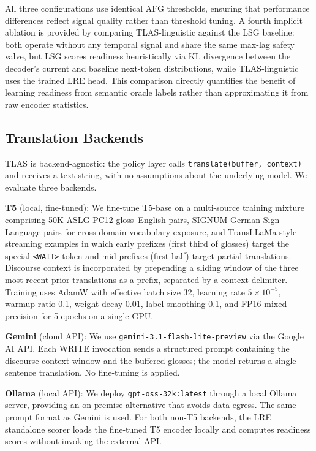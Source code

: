 \documentclass[conference]{IEEEtran}
\begin{document}
All three configurations use identical AFG thresholds, ensuring that performance differences reflect signal quality rather than threshold tuning. A fourth implicit ablation is provided by comparing TLAS-linguistic against the LSG baseline: both operate without any temporal signal and share the same max-lag safety valve, but LSG scores readiness heuristically via KL divergence between the decoder's current and baseline next-token distributions, while TLAS-linguistic uses the trained LRE head. This comparison directly quantifies the benefit of learning readiness from semantic oracle labels rather than approximating it from raw encoder statistics.

\subsection{Translation Backends}

TLAS is backend-agnostic: the policy layer calls \texttt{translate(buffer, context)} and receives a text string, with no assumptions about the underlying model. We evaluate three backends.

\textbf{T5} (local, fine-tuned): We fine-tune T5-base \cite{raffel2020exploring} on a multi-source training mixture comprising 50K ASLG-PC12 gloss--English pairs, SIGNUM German Sign Language pairs for cross-domain vocabulary exposure, and TransLLaMa-style streaming examples in which early prefixes (first third of glosses) target the special \texttt{<WAIT>} token and mid-prefixes (first half) target partial translations. Discourse context is incorporated by prepending a sliding window of the three most recent prior translations as a prefix, separated by a context delimiter. Training uses AdamW with effective batch size 32, learning rate $5 \times 10^{-5}$, warmup ratio 0.1, weight decay 0.01, label smoothing 0.1, and FP16 mixed precision for 5 epochs on a single GPU.

\textbf{Gemini} (cloud API): We use \texttt{gemini-3.1-flash-lite-preview} via the Google AI API. Each WRITE invocation sends a structured prompt containing the discourse context window and the buffered glosses; the model returns a single-sentence translation. No fine-tuning is applied.

\textbf{Ollama} (local API): We deploy \texttt{gpt-oss-32k:latest} through a local Ollama server, providing an on-premise alternative that avoids data egress. The same prompt format as Gemini is used. For both non-T5 backends, the LRE standalone scorer loads the fine-tuned T5 encoder locally and computes readiness scores without invoking the external API.
\end{document}
